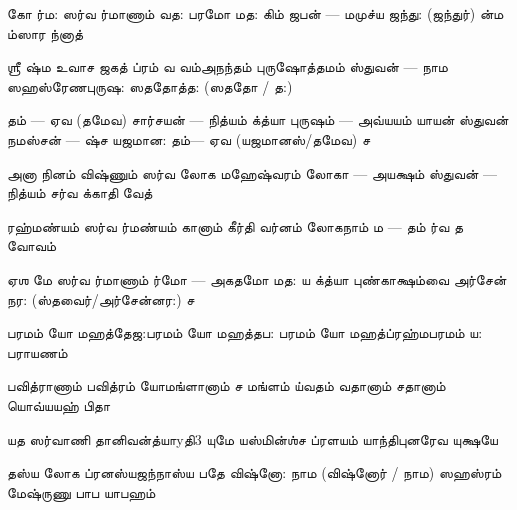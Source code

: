 \documentclass[10pt]{article}
\begin{document}
{%
\slokasl
{கோ ர்ம: ஸர்வ ர்மாணாம்}{ வத: பரமோ மத:}
{கிம் ஜபன் — மமுச்ய ஜந்து: (ஜந்துர்)}{ ன்ம ம்ஸார ந்னாத்}

\slokadl 
{ஶ்ரீ ஷ்ம உவாச}
{ஜகத் ப்ரம் வ வம்}{அநந்தம் புருஷோத்தமம்}
{ஸ்துவன் — நாம ஸஹஸ்ரேண}{புருஷ: ஸததோத்த: (ஸததோ / த:)}

\newpage
\slokasl
{தம் — ஏவ (தமேவ) சார்சயன் — நித்யம்} {க்த்யா புருஷம் — அவ்யயம்}
{யாயன் ஸ்துவன் நமஸ்சன் — ஷ்ச} {யஜமான: தம்— ஏவ (யஜமானஸ்/தமேவ) ச}

\slokasl
{அனா நினம் விஷ்ணும்} {ஸர்வ லோக மஹேஷ்வரம்}
{லோகா — அயக்ஷம் ஸ்துவன் — நித்யம்} {சர்வ க்காதி வேத்}

\slokasl
{ரஹ்மண்யம் ஸர்வ ர்மண்யம்} {கானாம் கீர்தி வர்னம்}
{லோகநாம் ம — தம்} {ர்வ த வோவம்}

\slokasl
{ஏஶ மே ஸர்வ ர்மாணாம்}{ ர்மோ — அகதமோ மத:}
{ய \dash {}க்த்யா புண்காக்ஷம்}{வை அர்சேன் நர: (ஸ்தவைர்/அர்சேன்னர:) ச}

\newpage
\slokasl
{பரமம் யோ மஹத்தேஜ:}{பரமம் யோ மஹத்தப:}
{பரமம் யோ மஹத்ப்ரஹ்ம}{பரமம் ய: பராயணம்}

\slokasl
{பவித்ராணாம் பவித்ரம் யோ}{மங்ளானாம் ச மங்ளம்}
{ய்வதம் வதானாம் ச}{தானாம் யொவ்யயஹ் பிதா}

\slokasl
{யத ஸர்வாணி தானி}{வன்த்யாy{தி}{3} யுமே}
{யஸ்மின்ஶ்ச ப்ரளயம் யாந்தி}{புனரேவ யுக்ஷயே}

\slokasl
{தஸ்ய லோக ப்ரனஸ்ய}{ஜந்நாஸ்ய பதே}
{விஷ்னோ: \dash நாம (விஷ்னோர் / நாம) ஸஹஸ்ரம் மே}{ஷ்ருணு பாப யாபஹம்}

}
\end{document}
